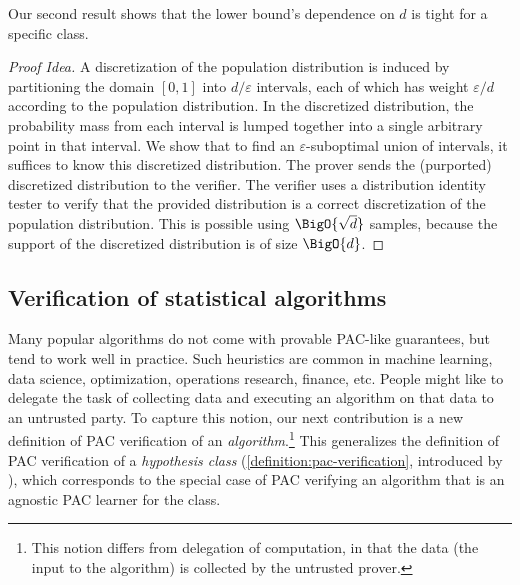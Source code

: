 Our second result shows that the lower bound's dependence on $d$ is tight for a specific class.


\begin{proof}[Proof Idea]
	A discretization of the population distribution is induced by partitioning the domain $[0,1]$ into $d/\varepsilon$ intervals, each of which has weight $\varepsilon/d$ according to the population distribution. In the discretized distribution, the probability mass from each interval is lumped together into a single arbitrary point in that interval. We show that to find an $\varepsilon$-suboptimal union of intervals, it suffices to know this discretized distribution. The prover sends the (purported) discretized distribution to the verifier. The verifier uses a distribution identity tester to verify that the provided distribution is a correct discretization of the population distribution. This is possible using $\BigO{\sqrt{d}}$ samples, because the support of the discretized distribution is of size $\BigO{d}$.
\end{proof} 

\subsection{Verification of statistical algorithms}\label{section:verification-of-statistical-algorithm}

Many popular algorithms do not come with provable PAC-like guarantees, but tend to work well in practice. Such heuristics are common in machine learning, data science, optimization, operations research, finance, etc. People might like to delegate the task of collecting data and executing an algorithm on that data to an untrusted party.
To capture this notion, our next contribution is a new definition of PAC verification of an \emph{algorithm}.\footnote{This notion differs from delegation of computation, in that the data (the input to the algorithm) is collected by the untrusted prover.}
This generalizes the definition of PAC verification of a \emph{hypothesis class} (\cref{definition:pac-verification}, introduced by \cite{GoldwasserRSY21}), which corresponds to the special case of PAC verifying an algorithm that is an agnostic PAC learner for the class.

